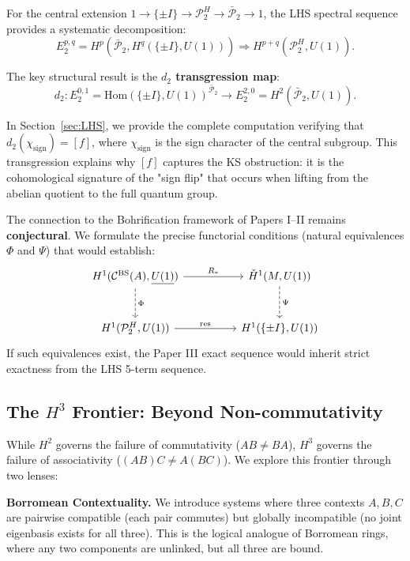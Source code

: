 \documentclass[11pt]{article}
\begin{document}
For the central extension $1 \to \{\pm I\} \to \mathcal{P}_2^H \to \bar{\mathcal{P}}_2 \to 1$, the LHS spectral sequence provides a systematic decomposition:
\[
    E_2^{p,q} = H^p(\bar{\mathcal{P}}_2, H^q(\{\pm I\}, U(1))) \Rightarrow H^{p+q}(\mathcal{P}_2^H, U(1)).
\]

The key structural result is the \textbf{$d_2$ transgression map}:
\[
    d_2: E_2^{0,1} = \mathrm{Hom}(\{\pm I\}, U(1))^{\bar{\mathcal{P}}_2} \longrightarrow E_2^{2,0} = H^2(\bar{\mathcal{P}}_2, U(1)).
\]

In Section~\ref{sec:LHS}, we provide the complete computation verifying that $d_2(\chi_{\text{sign}}) = [f]$, where $\chi_{\text{sign}}$ is the sign character of the central subgroup. This transgression explains why $[f]$ captures the KS obstruction: it is the cohomological signature of the "sign flip" that occurs when lifting from the abelian quotient to the full quantum group.

The connection to the Bohrification framework of Papers I--II remains \textbf{conjectural}. We formulate the precise functorial conditions (natural equivalences $\Phi$ and $\Psi$) that would establish:
\[
\begin{tikzcd}[row sep=large, column sep=huge]
  H^1(\mathcal{C}^{\mathrm{BS}}(A), \underline{U(1)}) \arrow[r, "R_*"] \arrow[d, dashed, "\Phi"] & \check{H}^1(M, U(1)) \arrow[d, dashed, "\Psi"] \\
  H^1(\mathcal{P}_2^H, U(1)) \arrow[r, "\mathrm{res}"] & H^1(\{\pm I\}, U(1))
\end{tikzcd}
\]
If such equivalences exist, the Paper III exact sequence would inherit strict exactness from the LHS 5-term sequence.

\subsection{The $H^3$ Frontier: Beyond Non-commutativity}

While $H^2$ governs the failure of commutativity ($AB \neq BA$), $H^3$ governs the failure of associativity ($(AB)C \neq A(BC)$). We explore this frontier through two lenses:

\textbf{Borromean Contextuality.} We introduce systems where three contexts $A, B, C$ are pairwise compatible (each pair commutes) but globally incompatible (no joint eigenbasis exists for all three). This is the logical analogue of Borromean rings, where any two components are unlinked, but all three are bound.
\end{document}
